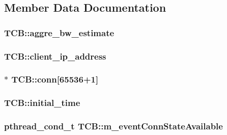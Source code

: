 \subsection{\-Member \-Data \-Documentation}
\hypertarget{structTCB_ab4f1301b04ebb91f5987fb1b386eef35}{
\subsubsection[{aggre\-\_\-bw\-\_\-estimate}]{ {\bf \-T\-C\-B\-::aggre\-\_\-bw\-\_\-estimate}}}\label{structTCB_ab4f1301b04ebb91f5987fb1b386eef35}
\hypertarget{structTCB_abc7140c6cddf3224e9cbe5c1f7b83962}{
\subsubsection[{client\-\_\-ip\-\_\-address}]{ {\bf \-T\-C\-B\-::client\-\_\-ip\-\_\-address}}}\label{structTCB_abc7140c6cddf3224e9cbe5c1f7b83962}
\hypertarget{structTCB_a1bd7c7b11c941c48cdb79aa785abaa1d}{
\subsubsection[{conn}]{$\ast$ {\bf \-T\-C\-B\-::conn}\mbox{[}65536+1\mbox{]}}}\label{structTCB_a1bd7c7b11c941c48cdb79aa785abaa1d}
\hypertarget{structTCB_ad28d5d458c5607d82e376a271cccb935}{
\subsubsection[{initial\-\_\-time}]{ {\bf \-T\-C\-B\-::initial\-\_\-time}}}\label{structTCB_ad28d5d458c5607d82e376a271cccb935}
\hypertarget{structTCB_ab95b1587e780086fb1f930e13c79ced7}{
\subsubsection[{m\-\_\-event\-Conn\-State\-Available}]{\setlength{\rightskip}{0pt plus 5cm}pthread\-\_\-cond\-\_\-t {\bf \-T\-C\-B\-::m\-\_\-event\-Conn\-State\-Available}}}\label{structTCB_ab95b1587e780086fb1f930e13c79ced7}
